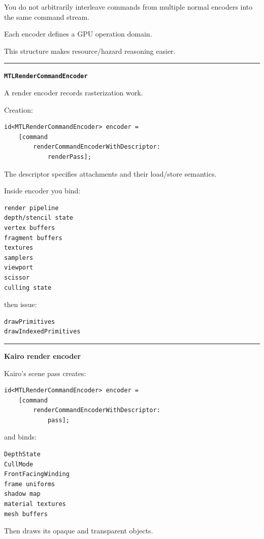 You do not arbitrarily interleave commands from multiple normal encoders into the same command stream.

Each encoder defines a GPU operation domain.

This structure makes resource/hazard reasoning easier.

\begin{center}\rule{0.5\linewidth}{0.5pt}\end{center}

\textbf{\texttt{MTLRenderCommandEncoder}}

A render encoder records rasterization work.

Creation:

\begin{verbatim}
id<MTLRenderCommandEncoder> encoder =
    [command
        renderCommandEncoderWithDescriptor:
            renderPass];
\end{verbatim}

The descriptor specifies attachments and their load/store semantics.

Inside encoder you bind:

\begin{verbatim}
render pipeline
depth/stencil state
vertex buffers
fragment buffers
textures
samplers
viewport
scissor
culling state
\end{verbatim}

then issue:

\begin{verbatim}
drawPrimitives
drawIndexedPrimitives
\end{verbatim}

\begin{center}\rule{0.5\linewidth}{0.5pt}\end{center}

\textbf{Kairo render encoder}

Kairo's scene pass creates:

\begin{verbatim}
id<MTLRenderCommandEncoder> encoder =
    [command
        renderCommandEncoderWithDescriptor:
            pass];
\end{verbatim}

and binds:

\begin{verbatim}
DepthState
CullMode
FrontFacingWinding
frame uniforms
shadow map
material textures
mesh buffers
\end{verbatim}

Then draws its opaque and transparent objects.

